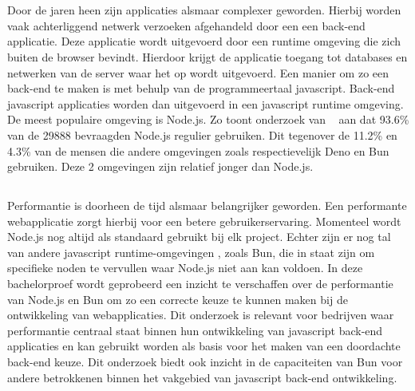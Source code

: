 
\chapter{}%
\label{ch:inleiding}


Door de jaren heen zijn applicaties alsmaar complexer geworden. Hierbij worden vaak achterliggend netwerk verzoeken afgehandeld door een 
een back-end applicatie. Deze applicatie wordt uitgevoerd door een runtime omgeving die zich buiten de browser bevindt.
Hierdoor krijgt de applicatie toegang tot databases en netwerken van de server waar het op wordt uitgevoerd.
Een manier om zo een back-end te maken is met behulp van de programmeertaal javascript. 
Back-end javascript applicaties worden dan uitgevoerd in een javascript runtime omgeving.
De meest populaire omgeving is Node.js. Zo toont onderzoek van ~\textcite{Greif2022} aan dat 93.6\% van de 29888 bevraagden Node.js 
regulier gebruiken.
Dit tegenover de 11.2\% en 4.3\% van de mensen die andere omgevingen zoals respectievelijk Deno en Bun gebruiken.
Deze 2 omgevingen zijn relatief jonger dan Node.js.

\section{}%
\label{sec:probleemstelling}

Performantie is doorheen de tijd alsmaar belangrijker geworden. 
Een performante webapplicatie zorgt hierbij voor een betere gebruikerservaring. 
Momenteel wordt Node.js nog altijd als standaard gebruikt bij elk project. Echter zijn er nog tal van andere javascript runtime-omgevingen
, zoals Bun, die in staat zijn om specifieke noden te vervullen waar Node.js niet aan kan voldoen. In deze bachelorproef wordt geprobeerd 
een inzicht te verschaffen over de performantie van Node.js en Bun
om zo een correcte keuze te kunnen maken bij de ontwikkeling van webapplicaties.
Dit onderzoek is relevant voor bedrijven waar performantie centraal staat binnen hun ontwikkeling van javascript back-end applicaties en kan gebruikt worden als basis 
voor het maken van een doordachte back-end keuze. Dit onderzoek 
biedt ook inzicht in de capaciteiten van Bun voor andere betrokkenen binnen het vakgebied van javascript back-end ontwikkeling.

